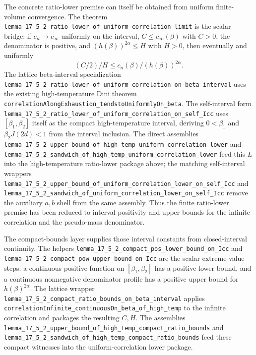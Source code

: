 \documentclass[a4paper,11pt]{article}
\begin{document}
The concrete ratio-lower premise can itself be obtained from uniform
finite-volume convergence.  The theorem
\texttt{lemma\_17\_5\_2\_ratio\_lower\_of\_uniform\_correlation\_limit}
is the scalar bridge: if \(c_n\to c_\infty\) uniformly on the interval,
\(C\le c_\infty(\beta)\) with \(C>0\), the denominator is positive, and
\((h(\beta))^{2\alpha}\le H\) with \(H>0\), then eventually and uniformly
\[
  (C/2)/H \le c_n(\beta)/(h(\beta))^{2\alpha}.
\]
The lattice beta-interval specialization
\texttt{lemma\_17\_5\_2\_ratio\_lower\_of\_uniform\_correlation\_on\_beta\_interval}
uses the existing high-temperature Dini theorem
\texttt{correlationAlongExhaustion\_tendstoUniformlyOn\_beta}.  The
self-interval form
\texttt{lemma\_17\_5\_2\_ratio\_lower\_of\_uniform\_correlation\_on\_self\_Icc}
uses \([\beta_1,\beta_2]\) itself as the compact high-temperature interval,
deriving \(0<\beta_1\) and \(\beta_2J(2d)<1\) from the interval inclusion.
The direct
assemblies
\texttt{lemma\_17\_5\_2\_upper\_bound\_of\_high\_temp\_uniform\_correlation\_lower}
and
\texttt{lemma\_17\_5\_2\_sandwich\_of\_high\_temp\_uniform\_correlation\_lower}
feed this \(L\) into the high-temperature ratio-lower package above; the
matching self-interval wrappers
\texttt{lemma\_17\_5\_2\_upper\_bound\_of\_uniform\_correlation\_lower\_on\_self\_Icc}
and
\texttt{lemma\_17\_5\_2\_sandwich\_of\_uniform\_correlation\_lower\_on\_self\_Icc}
remove the auxiliary \(a,b\) shell from the same assembly.  Thus the finite
ratio-lower premise has been reduced to interval positivity and upper bounds
for the infinite correlation and the pseudo-mass denominator.

The compact-bounds layer supplies those interval constants from closed-interval
continuity.  The helpers
\texttt{lemma\_17\_5\_2\_compact\_pos\_lower\_bound\_on\_Icc} and
\texttt{lemma\_17\_5\_2\_compact\_pow\_upper\_bound\_on\_Icc} are the scalar
extreme-value steps: a continuous positive function on \([\beta_1,\beta_2]\)
has a positive lower bound, and a continuous nonnegative denominator profile
has a positive upper bound for \(h(\beta)^{2\alpha}\).  The lattice wrapper
\texttt{lemma\_17\_5\_2\_compact\_ratio\_bounds\_on\_beta\_interval} applies
\texttt{correlationInfinite\_continuousOn\_beta\_of\_high\_temp} to the
infinite correlation and packages the resulting \(C,H\).  The assemblies
\texttt{lemma\_17\_5\_2\_upper\_bound\_of\_high\_temp\_compact\_ratio\_bounds}
and
\texttt{lemma\_17\_5\_2\_sandwich\_of\_high\_temp\_compact\_ratio\_bounds}
feed these compact witnesses into the uniform-correlation lower package.
\end{document}
